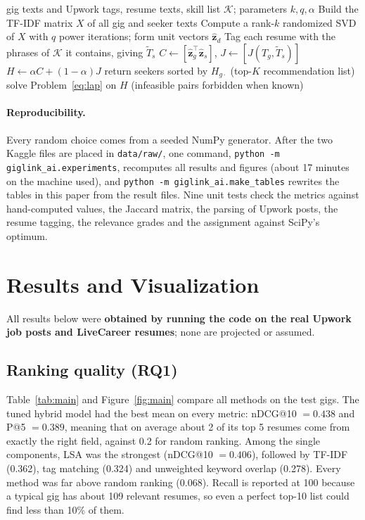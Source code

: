 \documentclass[12pt,a4paper]{article}
\numberwithin{equation}{section}
\theoremstyle{definition}
\theoremstyle{plain}
\newcommand{\DataRelTwo}{109}
\newcommand{\DataRuntimeMin}{17}
\begin{document}
\begin{algorithm}[htbp]
\caption{GigLink provider matching}\label{alg:pipeline}
\begin{algorithmic}[1]
\Require gig texts and Upwork tags, resume texts, skill list $\mathcal{K}$; parameters $k, q, \alpha$
\State Build the TF-IDF matrix $X$ of all gig and seeker texts 
\State Compute a rank-$k$ randomized SVD of $X$ with $q$ power iterations; form unit vectors $\hat{\bm z}_d$ 
\State Tag each resume with the phrases of $\mathcal{K}$ it contains, giving $\tilde T_s$
\State $C\gets[\hat{\bm z}_g^\top\hat{\bm z}_s]$, $J\gets[J(T_g,\tilde T_s)]$
\State $H\gets\alpha C+(1-\alpha)J$ 
 \State return seekers sorted by $H_{g\cdot}$ (top-$K$ recommendation list) \EndFor
{} \State solve Problem~\eqref{eq:lap} on $H$ (infeasible pairs forbidden when known) \EndIf
\end{algorithmic}
\end{algorithm}

\paragraph{Reproducibility.} Every random choice comes from a seeded NumPy generator. After the two Kaggle files are placed in \texttt{data/raw/}, one command, \texttt{python -m giglink\_ai.experiments}, recomputes all results and figures (about \DataRuntimeMin{} minutes on the machine used), and \texttt{python -m giglink\_ai.make\_tables} rewrites the tables in this paper from the result files. Nine unit tests check the metrics against hand-computed values, the Jaccard matrix, the parsing of Upwork posts, the resume tagging, the relevance grades and the assignment against SciPy's optimum.

\section{Results and Visualization}\label{sec:results}
All results below were \textbf{obtained by running the code on the real Upwork job posts and LiveCareer resumes}; none are projected or assumed.

\subsection{Ranking quality (RQ1)}
Table~\ref{tab:main} and Figure~\ref{fig:main} compare all methods on the test gigs. The tuned hybrid model had the best mean on every metric: nDCG@10 $=0.438$ and P@5 $=0.389$, meaning that on average about 2 of its top 5 resumes come from exactly the right field, against 0.2 for random ranking. Among the single components, LSA was the strongest (nDCG@10 $=0.406$), followed by TF-IDF (0.362), tag matching (0.324) and unweighted keyword overlap (0.278). Every method was far above random ranking (0.068). Recall is reported at 100 because a typical gig has about \DataRelTwo{} relevant resumes, so even a perfect top-10 list could find less than 10\% of them.
\end{document}
